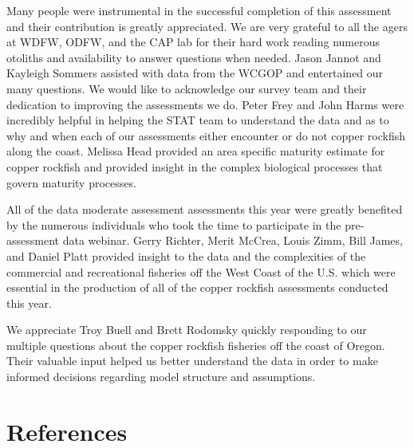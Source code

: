 \documentclass[11pt,
  english,
  a4paper,
]{article}
\begin{document}
Many people were instrumental in the successful completion of this assessment and their contribution is greatly appreciated. We are very grateful to all the agers at WDFW, ODFW, and the CAP lab for their hard work reading numerous otoliths and availability to answer questions when needed. Jason Jannot and Kayleigh Sommers assisted with data from the WCGOP and entertained our many questions. We would like to acknowledge our survey team and their dedication to improving the assessments we do. Peter Frey and John Harms were incredibly helpful in helping the STAT team to understand the data and as to why and when each of our assessments either encounter or do not copper rockfish along the coast. Melissa Head provided an area specific maturity estimate for copper rockfish and provided insight in the complex biological processes that govern maturity processes.

\leavevmode\tagmcend\tagstructend\par


All of the data moderate assessment assessments this year were greatly benefited by the numerous individuals who took the time to participate in the pre-assessment data webinar. Gerry Richter, Merit McCrea, Louis Zimm, Bill James, and Daniel Platt provided insight to the data and the complexities of the commercial and recreational fisheries off the West Coast of the U.S. which were essential in the production of all of the copper rockfish assessments conducted this year.

\leavevmode\tagmcend\tagstructend\par


We appreciate Troy Buell and Brett Rodomsky quickly responding to our multiple questions about the copper rockfish fisheries off the coast of Oregon. Their valuable input helped us better understand the data in order to make informed decisions regarding model structure and assumptions.

\leavevmode\tagmcend\tagstructend\par

\clearpage


\hypertarget{references}{%
\section{References}\label{references}}
\end{document}
